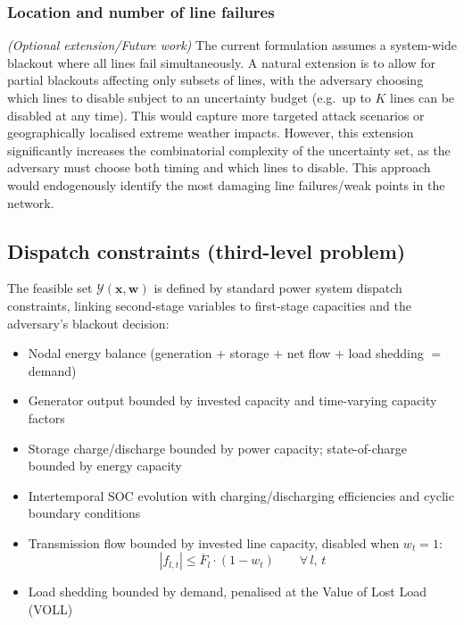 \documentclass[11pt, a4paper]{article}
\begin{document}
\subsubsection{Location and number of line failures}
\textit{(Optional extension/Future work)} The current formulation assumes a system-wide blackout where all lines fail simultaneously. A natural extension is to allow for partial blackouts affecting only subsets of lines, with the adversary choosing which lines to disable subject to an uncertainty budget (e.g.\ up to $K$ lines can be disabled at any time). This would capture more targeted attack scenarios or geographically localised extreme weather impacts. However, this extension significantly increases the combinatorial complexity of the uncertainty set, as the adversary must choose both timing and which lines to disable. This approach would endogenously identify the most damaging line failures/weak points in the network.


\subsection{Dispatch constraints (third-level problem)}

The feasible set $\mathcal{Y}(\mathbf{x}, \mathbf{w})$ is defined by standard power system dispatch constraints, linking second-stage variables to first-stage capacities and the adversary's blackout decision:
%
\begin{itemize}[nosep]
  \item Nodal energy balance (generation $+$ storage $+$ net flow $+$ load shedding $=$ demand)
  \item Generator output bounded by invested capacity and time-varying capacity factors
  \item Storage charge/discharge bounded by power capacity; state-of-charge bounded by energy capacity
  \item Intertemporal SOC evolution with charging/discharging efficiencies and cyclic boundary conditions
  \item Transmission flow bounded by invested line capacity, disabled when $w_t = 1$:
    \begin{equation}
      |f_{l,t}| \leq \overline{F}_l \cdot (1 - w_t) \qquad \forall\, l,\, t
    \end{equation}
  \item Load shedding bounded by demand, penalised at the Value of Lost Load (VOLL)
\end{itemize}
\end{document}
